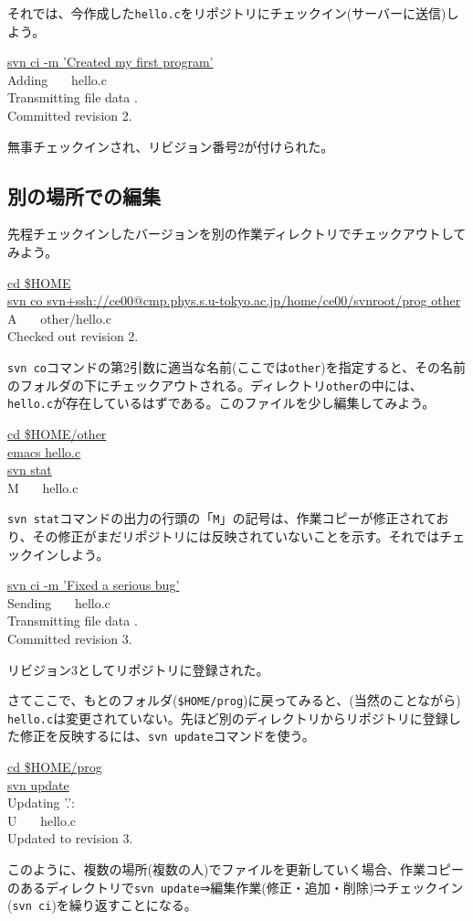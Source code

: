 それでは、今作成した{\tt hello.c}をリポジトリにチェックイン(サーバーに送信)しよう。
\begin{commandline2}
\prompt \underline{svn ci -m 'Created my first program'} \\
Adding \ \ \ hello.c \\
Transmitting file data . \\
Committed revision 2.
\end{commandline2} \noindent
無事チェックインされ、リビジョン番号2が付けられた。

\subsection{別の場所での編集}

先程チェックインしたバージョンを別の作業ディレクトリでチェックアウトしてみよう。
\begin{commandline2}
\prompt \underline{cd \$HOME} \\
\prompt \underline{svn co svn+ssh://ce00@cmp.phys.s.u-tokyo.ac.jp/home/ce00/svnroot/prog other} \\
A \ \ \ other/hello.c \\
Checked out revision 2.
\end{commandline2} \noindent
{\tt svn co}コマンドの第2引数に適当な名前(ここでは{\tt other})を指定すると、その名前のフォルダの下にチェックアウトされる。ディレクトリ{\tt other}の中には、{\tt hello.c}が存在しているはずである。このファイルを少し編集してみよう。
\begin{commandline2}
\prompt \underline{cd \$HOME/other} \\
\prompt \underline{emacs hello.c} \\
\prompt \underline{svn stat} \\
M \ \ \ hello.c
\end{commandline2} \noindent
{\tt svn stat}コマンドの出力の行頭の「{\tt M}」の記号は、作業コピーが修正されており、その修正がまだリポジトリには反映されていないことを示す。それではチェックインしよう。
\begin{commandline2}
\prompt \underline{svn ci -m 'Fixed a serious bug'} \\
Sending \ \ \ hello.c \\
Transmitting file data . \\
Committed revision 3.
\end{commandline2} \noindent
リビジョン3としてリポジトリに登録された。

さてここで、もとのフォルダ({\tt \$HOME/prog})に戻ってみると、(当然のことながら) {\tt hello.c}は変更されていない。先ほど別のディレクトリからリポジトリに登録した修正を反映するには、{\tt svn update}コマンドを使う。
\begin{commandline2}
\prompt \underline{cd \$HOME/prog} \\
\prompt \underline{svn update} \\
Updating '.': \\
U \ \ \ hello.c \\
Updated to revision 3.
\end{commandline2} \noindent
このように、複数の場所(複数の人)でファイルを更新していく場合、作業コピーのあるディレクトリで{\tt svn update}⇒編集作業(修正・追加・削除)⇒チェックイン({\tt svn ci})を繰り返すことになる。

